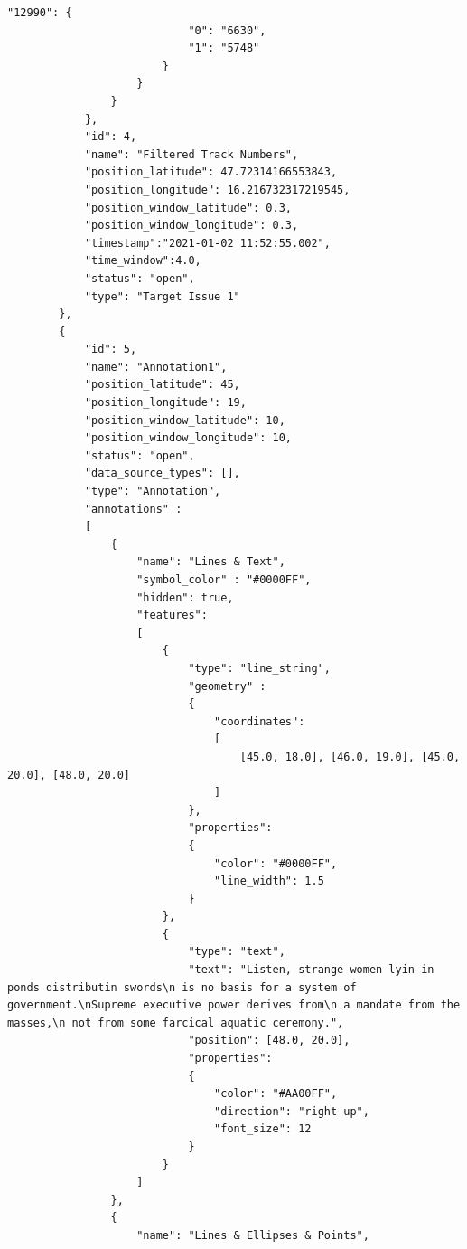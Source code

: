 \begin{lstlisting}[basicstyle=\small\ttfamily]
                        "12990": {
                            "0": "6630",
                            "1": "5748"
                        }
                    }
                }
            },
            "id": 4,
            "name": "Filtered Track Numbers",
            "position_latitude": 47.72314166553843,
            "position_longitude": 16.216732317219545,
            "position_window_latitude": 0.3,
            "position_window_longitude": 0.3,
            "timestamp":"2021-01-02 11:52:55.002",
            "time_window":4.0,
            "status": "open",
            "type": "Target Issue 1"
        },
        {
            "id": 5,
            "name": "Annotation1",
            "position_latitude": 45,
            "position_longitude": 19,
            "position_window_latitude": 10,
            "position_window_longitude": 10,
            "status": "open",
            "data_source_types": [],
            "type": "Annotation",
            "annotations" :
            [
                {
                    "name": "Lines & Text",
                    "symbol_color" : "#0000FF",
                    "hidden": true,
                    "features":
                    [
                        {
                            "type": "line_string",
                            "geometry" :
                            {
                                "coordinates": 
                                [
                                    [45.0, 18.0], [46.0, 19.0], [45.0, 20.0], [48.0, 20.0]
                                ]
                            },
                            "properties":
                            {
                                "color": "#0000FF",
                                "line_width": 1.5
                            }
                        },
                        {
                            "type": "text",
                            "text": "Listen, strange women lyin in ponds distributin swords\n is no basis for a system of government.\nSupreme executive power derives from\n a mandate from the masses,\n not from some farcical aquatic ceremony.",
                            "position": [48.0, 20.0],
                            "properties":
                            {
                                "color": "#AA00FF",
                                "direction": "right-up",
                                "font_size": 12
                            }
                        }                        
                    ]
                },
                {
                    "name": "Lines & Ellipses & Points",

\end{lstlisting}
